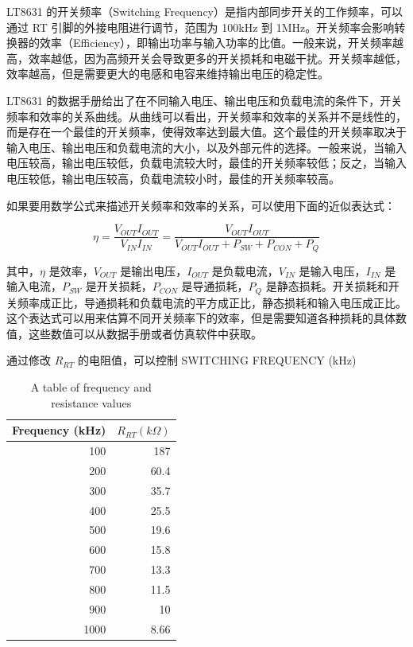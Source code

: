 \documentclass[lang=cn,10pt]{elegantbook}
\begin{document}
LT8631 的开关频率（Switching Frequency）是指内部同步开关的工作频率，可以通过 RT 引脚的外接电阻进行调节，范围为 100kHz 到 1MHz。开关频率会影响转换器的效率（Efficiency），即输出功率与输入功率的比值。一般来说，开关频率越高，效率越低，因为高频开关会导致更多的开关损耗和电磁干扰。开关频率越低，效率越高，但是需要更大的电感和电容来维持输出电压的稳定性。

LT8631 的数据手册给出了在不同输入电压、输出电压和负载电流的条件下，开关频率和效率的关系曲线。从曲线可以看出，开关频率和效率的关系并不是线性的，而是存在一个最佳的开关频率，使得效率达到最大值。这个最佳的开关频率取决于输入电压、输出电压和负载电流的大小，以及外部元件的选择。一般来说，当输入电压较高，输出电压较低，负载电流较大时，最佳的开关频率较低；反之，当输入电压较低，输出电压较高，负载电流较小时，最佳的开关频率较高。

如果要用数学公式来描述开关频率和效率的关系，可以使用下面的近似表达式：

$$\eta = \frac{V_{OUT}I_{OUT}}{V_{IN}I_{IN}} = \frac{V_{OUT}I_{OUT}}{V_{OUT}I_{OUT} + P_{SW} + P_{CON} + P_{Q}}$$

其中，$\eta$ 是效率，$V_{OUT}$ 是输出电压，$I_{OUT}$ 是负载电流，$V_{IN}$ 是输入电压，$I_{IN}$ 是输入电流，$P_{SW}$ 是开关损耗，$P_{CON}$ 是导通损耗，$P_{Q}$ 是静态损耗。开关损耗和开关频率成正比，导通损耗和负载电流的平方成正比，静态损耗和输入电压成正比。这个表达式可以用来估算不同开关频率下的效率，但是需要知道各种损耗的具体数值，这些数值可以从数据手册或者仿真软件中获取。

通过修改 $R_{RT}$ 的电阻值，可以控制 SWITCHING FREQUENCY (kHz)

\begin{table}[h]
    \centering
    \begin{tabular}{@{}rr@{}}
    \toprule
    Frequency (kHz) & $R_{RT} (k\Omega)$ \\ \midrule
    100             & 187                \\
    200             & 60.4               \\
    300             & 35.7               \\
    400             & 25.5               \\
    500             & 19.6               \\
    600             & 15.8               \\
    700             & 13.3               \\
    800             & 11.5               \\
    900             & 10                 \\
    1000            & 8.66               \\ \bottomrule
    \end{tabular}
    \caption{A table of frequency and resistance values}
    \label{tab:SW Frequency vs $R_T$ Value}
\end{table}
\end{document}
